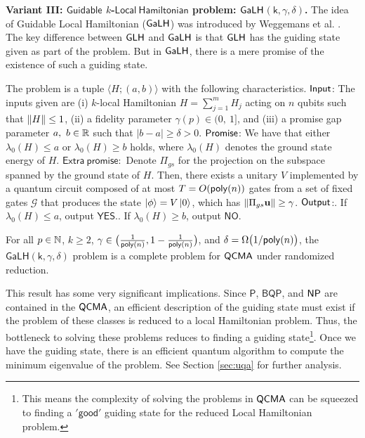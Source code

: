 \documentclass[11pt]{article}
\begin{document}
\textbf{Variant III: $\mathsf{Guidable}$ $k$-$\mathsf{Local\ Hamiltonian}$ problem: $\mathsf{GaLH}$$\mathsf{(k,\gamma,\delta)}$. }
The idea of Guidable Local Hamiltonian ($\mathsf{GaLH}$) was introduced by Weggemans et al. \cite{weggemans2023guidable}. The key difference between $\mathsf{GLH}$ and $\mathsf{GaLH}$ is that $\mathsf{GLH}$ has the guiding state given as part of the problem. But in $\mathsf{GaLH}$, there is a mere promise of the existence of such a guiding state.
\begin{prob}
     The problem is a tuple $\langle H;(a,b) \rangle$ with the following characteristics. \newline
    $\mathsf{Input}$: The inputs given are (i) $k$-local Hamiltonian $H=\sum_{j=1}^{m}H_j$ acting on $n$ qubits such that $\norm{H}\leq 1$, (ii) a fidelity parameter $\gamma(p)\in (0,\ 1]$, and (iii) a promise gap parameter $a,\ b\in \mathbb{R}$ such that $|b-a|\geq \delta>0$. \newline
    $\mathsf{Promise}$: We have that either $\lambda_0(H) \leq a$ or $\lambda_0(H) \geq b$ holds, where $\lambda_0(H)$ denotes the ground state energy of $H$.\newline
    $\mathsf{Extra\ promise:}$ Denote $\Pi_{gs}$ for the projection on the subspace spanned by the ground state of $H$. Then, there exists a unitary $V$ implemented by a quantum circuit composed of at most $T=O(\mathsf{poly}(n))$ gates from a set of fixed gates $\mathcal{G}$ that produces the state $\ket{\phi}=V\ket{0}$, which has $\norm{\Pi_{gs}\mathbf{u}}\geq \gamma$.\newline
    $\mathsf{Output}$:. If $\lambda_0(H) \leq a$, output $\mathsf{YES}$.. If $\lambda_0(H) \geq b$, output $\mathsf{NO}$.
\end{prob}
\begin{theorem}
     For all $p\in \mathbb{N}$, $k\geq 2$, $\gamma \in \big(\frac{1}{\mathsf{poly}(n)},1-\frac{1}{\mathsf{poly}(n)}\big)$, and $\delta=\Omega \big(1/\mathsf{poly}(n)\big)$, the $\mathsf{GaLH(k,\gamma,\delta)}$ problem is a complete problem for $\mathsf{QCMA}$ under randomized reduction.
\end{theorem}
This result has some very significant implications. Since $\mathsf{P}$, $\mathsf{BQP}$, and $\mathsf{NP}$ are contained in the $\mathsf{QCMA}$, an efficient description of the guiding state must exist if the problem of these classes is reduced to a local Hamiltonian problem. Thus, the bottleneck to solving these problems reduces to finding a guiding state\footnote{This means the complexity of solving the problems in $\mathsf{QCMA}$ can be squeezed to finding a $\mathsf{'good'}$ guiding state for the reduced Local Hamiltonian problem.}. Once we have the guiding state, there is an efficient quantum algorithm to compute the minimum eigenvalue of the problem. See Section \ref{sec:uqa} for further analysis.\par
\end{document}
